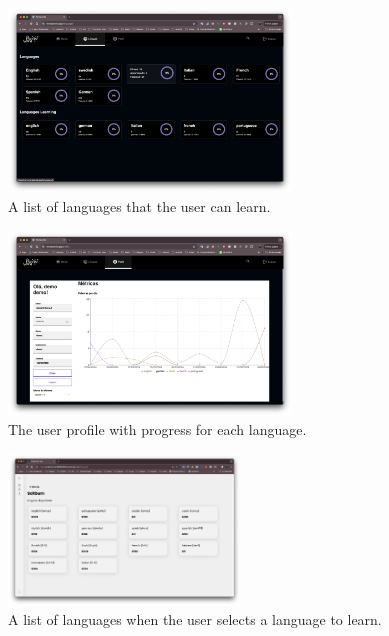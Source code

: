 \documentclass[12pt]{article}
\begin{document}
  \begin{figure}[!h]
    \centering
    \caption{
    A list of languages that the user can learn. 
    }
    \label{fig:site2}
    \includegraphics[width=0.67\textwidth]{assets/21.png}
  \end{figure}

    \begin{figure}[!h]
      \centering
      \caption{
      The user profile with progress for each language.
      }
      \label{fig:site3}
      \includegraphics[width=0.67\textwidth]{assets/22.png}
    \end{figure}

    \begin{figure}[!h]
      \centering
      \caption{
      A list of languages when the user selects a language to learn.
      }
      \label{fig:site4}
      \includegraphics[width=0.55\textwidth]{assets/25.png}
    \end{figure}
\end{document}
